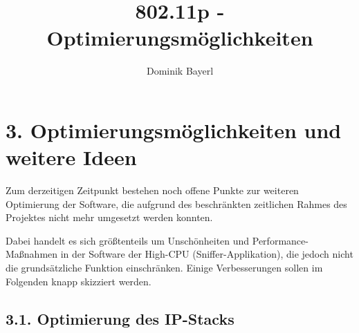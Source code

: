 \documentclass[ngerman,]{scrartcl}
\title{802.11p - Optimierungsmöglichkeiten}
\author{Dominik Bayerl}
\date{}
\begin{document}
\maketitle

\newcommand{\plusnamesingular}{}
\newcommand{\starnamesingular}{}
\newcommand{\xrefname}[1]{\protect\renewcommand{\plusnamesingular}{#1}}
\newcommand{\Xrefname}[1]{\protect\renewcommand{\starnamesingular}{#1}}
\providecommand{\cref}{\plusnamesingular~\ref}
\providecommand{\Cref}{\starnamesingular~\ref}
\providecommand{\crefformat}[2]{}
\providecommand{\Crefformat}[2]{}

\crefformat{figure}{fig.~#2#1#3}
\Crefformat{figure}{Figure~#2#1#3}
\crefformat{table}{Tab.~#2#1#3}
\Crefformat{table}{Table~#2#1#3}

\section{3. Optimierungsmöglichkeiten und weitere
Ideen}\label{optimierungsmuxf6glichkeiten-und-weitere-ideen}

Zum derzeitigen Zeitpunkt bestehen noch offene Punkte zur weiteren
Optimierung der Software, die aufgrund des beschränkten zeitlichen
Rahmes des Projektes nicht mehr umgesetzt werden konnten.

Dabei handelt es sich größtenteils um Unschönheiten und
Performance-Maßnahmen in der Software der High-CPU
(Sniffer-Applikation), die jedoch nicht die grundsätzliche Funktion
einschränken. Einige Verbesserungen sollen im Folgenden knapp skizziert
werden.

\subsection{3.1. Optimierung des
IP-Stacks}\label{optimierung-des-ip-stacks}
\end{document}

